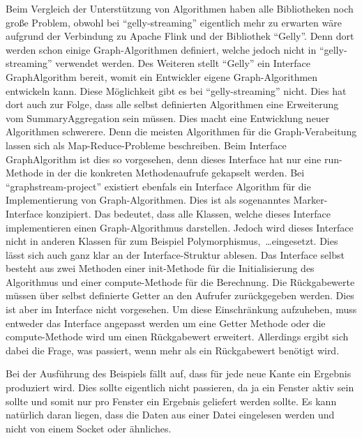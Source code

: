 Beim Vergleich der Unterstützung von Algorithmen haben alle Bibliotheken noch
große Problem, obwohl bei \enquote{gelly-streaming} eigentlich mehr zu erwarten
wäre aufgrund der Verbindung zu Apache Flink und der Bibliothek \enquote{Gelly}.
Denn dort werden schon einige Graph-Algorithmen definiert, welche jedoch nicht in
\enquote{gelly-streaming} verwendet werden. Des Weiteren stellt \enquote{Gelly}
ein Interface GraphAlgorithm bereit, womit ein Entwickler eigene Graph-Algorithmen
entwickeln kann. Diese Möglichkeit gibt es bei \enquote{gelly-streaming} nicht.
Dies hat dort auch zur Folge, dass alle selbst definierten Algorithmen eine
Erweiterung vom SummaryAggregation sein müssen. Dies macht eine Entwicklung
neuer Algorithmen schwerere. Denn die meisten Algorithmen für die
Graph-Verabeitung lassen sich als Map-Reduce-Probleme beschreiben. Beim Interface
GraphAlgorithm ist dies so vorgesehen, denn dieses Interface hat nur eine
run-Methode in der die konkreten Methodenaufrufe gekapselt werden. Bei
\enquote{graphstream-project} existiert ebenfals ein Interface Algorithm für die
Implementierung von Graph-Algorithmen. Dies ist als sogenanntes Marker-Interface
konzipiert. Das bedeutet, dass alle Klassen, welche dieses Interface
implementieren einen Graph-Algorithmus darstellen. Jedoch wird dieses Interface
nicht in anderen Klassen für zum Beispiel Polymorphismus,~\dots eingesetzt. Dies
lässt sich auch ganz klar an der Interface-Struktur ablesen. Das Interface selbst
besteht aus zwei Methoden einer init-Methode für die Initialisierung des
Algorithmus und einer compute-Methode für die Berechnung. Die Rückgabewerte
müssen über selbst definierte Getter an den Aufrufer zurückgegeben werden. Dies
ist aber im Interface nicht vorgesehen. Um diese Einschränkung aufzuheben, muss
entweder das Interface angepasst werden um eine Getter Methode oder die
compute-Methode wird um einen Rückgabewert erweitert. Allerdings ergibt sich
dabei die Frage, was passiert, wenn mehr als ein Rückgabewert benötigt wird.







Bei der Ausführung des Beispiels fällt auf, dass für jede neue Kante ein
Ergebnis produziert wird. Dies sollte eigentlich nicht passieren, da ja ein
Fenster aktiv sein sollte und somit nur pro Fenster ein Ergebnis geliefert
werden sollte. Es kann natürlich daran liegen, dass die Daten aus einer Datei
eingelesen werden und nicht von einem Socket oder ähnliches.


